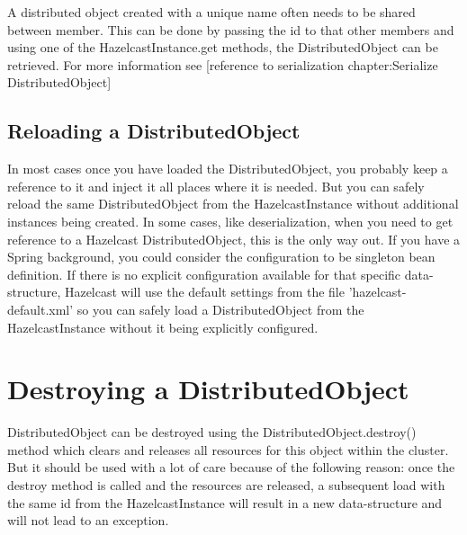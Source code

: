 A distributed object created with a unique name often needs to be shared between member. This can be done by passing the id to that other members and using one of the HazelcastInstance.get methods, the DistributedObject can be retrieved. For more information see [reference to serialization chapter:Serialize DistributedObject]

\subsection{Reloading a DistributedObject}
In most cases once you have loaded the DistributedObject, you probably keep a reference to it and inject it all places where it is needed. But you can safely reload the same DistributedObject from the HazelcastInstance without additional instances being created. In some cases, like deserialization, when you need to get reference to a Hazelcast DistributedObject, this is the only way out. If you have a Spring background, you could consider the configuration to be singleton bean definition. If there is no explicit configuration available for that specific data-structure, Hazelcast will use the default settings from the file 'hazelcast-default.xml' so you can safely load a DistributedObject from the HazelcastInstance without it being explicitly configured.

\section{Destroying a DistributedObject}
DistributedObject can be destroyed using the DistributedObject.destroy() method which clears and releases all resources for this object within the cluster. But it should be used with a lot of care because of the following reason: once the destroy method is called and the resources are released, a subsequent load with the same id from the HazelcastInstance will result in a new data-structure and will not lead to an exception. 


